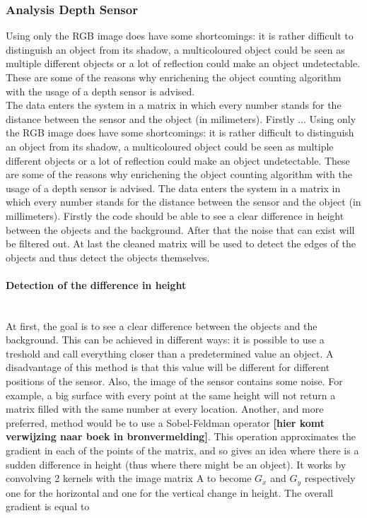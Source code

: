 \documentclass[11pt]{article}
\begin{document}
\subsubsection{Analysis Depth Sensor}
Using only the RGB image does have some shortcomings: it is rather difficult to distinguish an object from its shadow, a multicoloured object could be seen as multiple different objects or a lot of reflection could make an object undetectable. These are some of the reasons why enrichening the object counting algorithm with the usage of a depth sensor is advised.
\\
The data enters the system in a matrix in which every number stands for the distance between the sensor and the object (in milimeters). Firstly ...  
Using only the RGB image does have some shortcomings: it is rather difficult to distinguish an object from its shadow, a multicoloured object could be seen as multiple different objects or a lot of reflection could make an object undetectable. These are some of the reasons why enrichening the object counting algorithm with the usage of a depth sensor is advised. The data enters the system in a matrix in which every number stands for the distance between the sensor and the object (in millimeters). Firstly the code should be able to see a clear difference in height between the objects and the background. After that the noise that can exist will be filtered out. At last the cleaned matrix will be used to detect the edges of the objects and thus detect the objects themselves.
 
\paragraph{Detection of the difference in height}\mbox{}\\
At first, the goal is to see a clear difference between the objects and the background. This can be achieved in different ways: it is possible to use a treshold and call everything closer than a predetermined value an object. A disadvantage of this method is that this value will be different for different positions of the sensor. Also, the image of the sensor contains some noise. For example, a big surface with every point at the same height will not return a matrix filled with the same number at every location. Another, and more preferred, method would be to use a Sobel-Feldman operator \textbf{[hier komt verwijzing naar boek in bronvermelding]}. This operation approximates the gradient in each of the points of the matrix, and so gives an idea where there is a sudden difference in height (thus where there might be an object). It works by convolving 2 kernels with the image matrix A to become $G_{x}$ and $G_{y}$ respectively one for the horizontal and one for the vertical change in height. The overall gradient is equal to 
\end{document}
